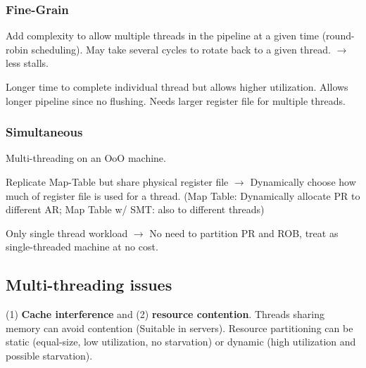 \documentclass{article}
\begin{document}
\begin{multicols*}{2}
\subsubsection*{Fine-Grain}
Add complexity to allow multiple threads in the pipeline at a given time (round-robin scheduling). May take several cycles to rotate back to a given thread. $\rightarrow$ less stalls.
\medskip\par\noindent
Longer time to complete individual thread but allows higher utilization. Allows longer pipeline since no flushing. Needs larger register file for multiple threads.

\subsubsection*{Simultaneous}
Multi-threading on an OoO machine.
\medskip\par\noindent
Replicate Map-Table but share physical register file $\rightarrow$ Dynamically choose how much of register file is used for a thread. (Map Table: Dynamically allocate PR to different AR; Map Table w/ SMT: also to different threads)
\medskip\par\noindent
Only single thread workload $\rightarrow$ No need to partition PR and ROB, treat as single-threaded machine at no cost.

\subsection*{Multi-threading issues}
(1) \textbf{Cache interference} and (2) \textbf{resource contention}. Threads sharing memory can avoid contention (Suitable in servers). Resource partitioning can be static (equal-size, low utilization, no starvation) or dynamic (high utilization and possible starvation).

\end{multicols*}
\end{document}
